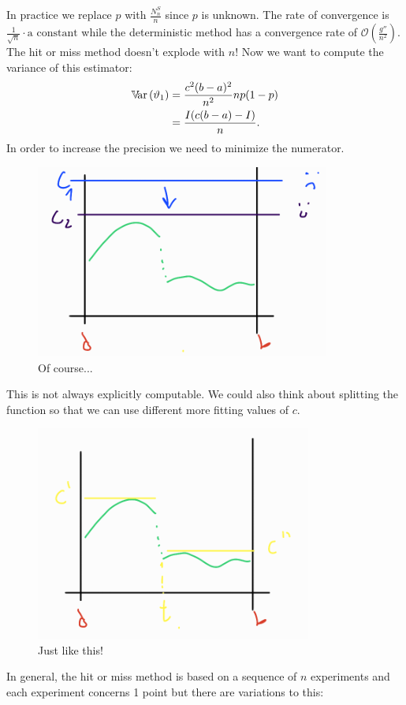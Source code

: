 \documentclass[12pt]{report}
\begin{document}
In practice we replace $p$ with $\frac{N^{S}_{n}}{n}$ since $p$ is unknown. The rate of convergence is $\frac{1}{\sqrt{n}}\cdot \text{a constant}$ while the deterministic method has a convergence rate of $\mathcal{O}\left(\frac{g''}{n^{2}}\right)$. The hit or miss method doesn't explode with $n$! Now we want to compute the variance of this estimator:
\begin{align*}
	\mathbb{V}\!\mathrm{ar}\,(\vartheta_1)&=\frac{c^{2}(b-a)^{2}}{n^{2}}np(1-p)\\
	&=\frac{I(c(b-a)-I)}{n}.
\end{align*}
In order to increase the precision we need to minimize the numerator.
\begin{figure}[h]
	\centering
	\includegraphics[width=0.5\linewidth]{img/screenshot068}
	\caption{Of course...}
	\label{fig:screenshot068}
\end{figure}
This is not always explicitly computable. We could also think about splitting the function so that we can use different more fitting values of $c$.
\begin{figure}[h]
	\centering
	\includegraphics[width=0.5\linewidth]{img/screenshot069}
	\caption{Just like this!}
	\label{fig:screenshot069}
\end{figure}
In general, the hit or miss method is based on a sequence of $n$ experiments and each experiment concerns 1 point but there are variations to this:
\end{document}
